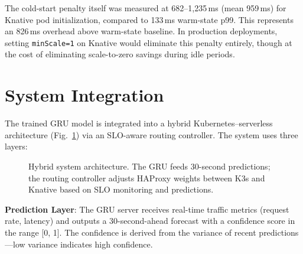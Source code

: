 \documentclass[conference,letterpaper]{IEEEtran}
\begin{document}
The cold-start penalty itself was measured at 682--1{,}235\,ms (mean 959\,ms) for Knative pod initialization, compared to 133\,ms warm-state p99. This represents an 826\,ms overhead above warm-state baseline. In production deployments, setting \texttt{minScale=1} on Knative would eliminate this penalty entirely, though at the cost of eliminating scale-to-zero savings during idle periods.

\section{System Integration}

The trained GRU model is integrated into a hybrid Kubernetes--serverless architecture (Fig.~\ref{fig:architecture}) via an SLO-aware routing controller. The system uses three layers:

\begin{figure}[htbp]
\centering
{}
\caption{Hybrid system architecture. The GRU feeds 30-second predictions; the routing controller adjusts HAProxy weights between K3s and Knative based on SLO monitoring and predictions.}
\label{fig:architecture}
\end{figure}

\textbf{Prediction Layer}: The GRU server receives real-time traffic metrics (request rate, latency) and outputs a 30-second-ahead forecast with a confidence score in the range [0, 1]. The confidence is derived from the variance of recent predictions---low variance indicates high confidence.
\end{document}
